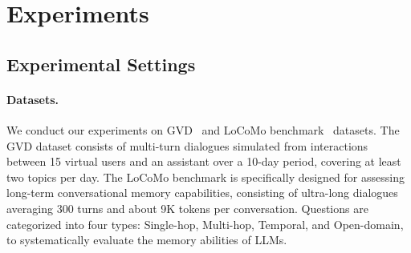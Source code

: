 \documentclass[11pt]{article}
\begin{document}

\section{Experiments}

\subsection{Experimental Settings}

\paragraph{Datasets.} 
We conduct our experiments on GVD~\cite{zhong2024memorybank} and LoCoMo benchmark~\cite{maharana-etal-2024-evaluating} datasets. The GVD dataset consists of multi-turn dialogues simulated from interactions between 15 virtual users and an assistant over a 10-day period, covering at least two topics per day. 
The LoCoMo benchmark is specifically designed for assessing long-term conversational memory capabilities, consisting of ultra-long dialogues averaging 300 turns and about 9K tokens per conversation. Questions are categorized into four types: Single-hop, Multi-hop, Temporal, and Open-domain, to systematically evaluate the memory abilities of LLMs.
\end{document}
